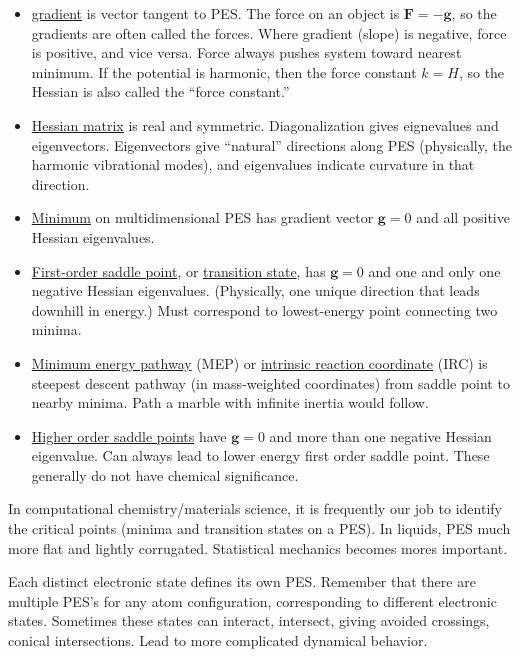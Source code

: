 \documentclass[11pt]{article}
\begin{document}
\begin{itemize}
\item \uline{gradient} is vector tangent to PES.  The force on an object is \(\bm{F} = - \bm{g}\), so the gradients are often called the forces.  Where gradient (slope) is negative, force is positive, and vice versa.  Force always pushes system toward nearest minimum. If the potential is harmonic, then the force constant \(k = H\), so the Hessian is also called the ``force constant.''

\item \uline{Hessian matrix} is real and symmetric. Diagonalization gives eignevalues and eigenvectors.  Eigenvectors give ``natural'' directions along PES (physically, the harmonic vibrational modes), and eigenvalues indicate curvature in that direction.

\item \uline{Minimum} on multidimensional PES has gradient vector \(\bm{g} = 0\) and all positive Hessian eigenvalues.

\item \uline{First-order saddle point}, or \uline{transition state}, has \(\bm{g} = 0\) and one and only one negative Hessian eigenvalues.  (Physically, one unique direction that leads downhill in energy.)  Must correspond to lowest-energy point connecting two minima.

\item \uline{Minimum energy pathway} (MEP) or \uline{intrinsic reaction coordinate} (IRC) is steepest descent pathway (in mass-weighted coordinates) from saddle point to nearby minima.  Path a marble with infinite inertia would follow.

\item \uline{Higher order saddle points} have \(\bm{g} = 0\) and more than one negative Hessian eigenvalue.  Can always lead to lower energy first order saddle point.  These generally do not have chemical significance.
\end{itemize}

In computational chemistry/materials science, it is frequently  our job to identify the critical points (minima and transition states on a PES).  In liquids, PES much more flat and lightly corrugated.  Statistical mechanics becomes mores important.

Each distinct electronic state defines its own PES. Remember that there are multiple PES’s for any atom configuration, corresponding to different electronic states.  Sometimes these states can interact, intersect, giving avoided crossings, conical intersections.  Lead to more complicated dynamical behavior.
\end{document}
